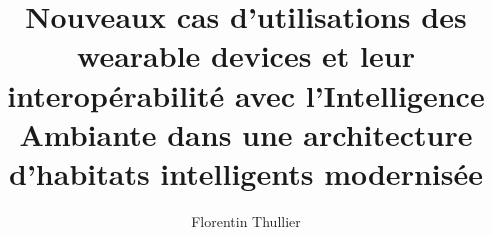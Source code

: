 \documentclass[12pt,times,these,french]{uqac}
\begin{document}
\title{Nouveaux cas d'utilisations des wearable devices et leur interopérabilité avec l’Intelligence Ambiante dans une architecture d'habitats intelligents modernisée}


\author{Florentin Thullier}

\maketitle

\opening


\tableofcontents
\listoftables
\listoffigures
\listofacro


%

\maincontent














\appendix


\end{document}
